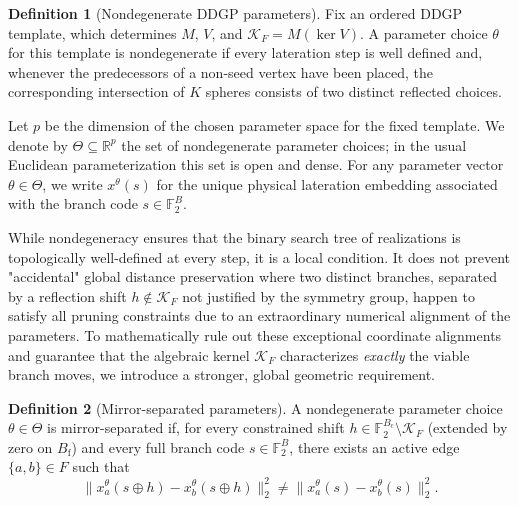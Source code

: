 \documentclass[11pt]{article}
\theoremstyle{plain}
\theoremstyle{definition}
\newtheorem{definition}{Definition}
\begin{document}
\begin{definition}[Nondegenerate DDGP parameters]
\label{def:nondegenerate-params}
Fix an ordered DDGP template, which determines $M$, $V$, and $\mathcal{K}_F = M(\ker V)$. A parameter choice $\theta$ for this template is nondegenerate if every lateration step is well defined and, whenever the predecessors of a non-seed vertex have been placed, the corresponding intersection of $K$ spheres consists of two distinct reflected choices. 
\end{definition}

Let $p$ be the dimension of the chosen parameter space for the fixed template. We denote by $\Theta \subseteq \mathbb{R}^p$ the set of nondegenerate parameter choices; in the usual Euclidean parameterization this set is open and dense. For any parameter vector $\theta \in \Theta$, we write $x^\theta(s)$ for the unique physical lateration embedding associated with the branch code $s \in \mathbb{F}_2^B$.

While nondegeneracy ensures that the binary search tree of realizations is topologically well-defined at every step, it is a local condition. It does not prevent "accidental" global distance preservation where two distinct branches, separated by a reflection shift $h \notin \mathcal{K}_F$ not justified by the symmetry group, happen to satisfy all pruning constraints due to an extraordinary numerical alignment of the parameters. To mathematically rule out these exceptional coordinate alignments and guarantee that the algebraic kernel $\mathcal{K}_F$ characterizes \emph{exactly} the viable branch moves, we introduce a stronger, global geometric requirement.

\begin{definition}[Mirror-separated parameters]
\label{def:mirror-sep}
A nondegenerate parameter choice $\theta \in \Theta$ is mirror-separated if, for every constrained shift $h\in\mathbb{F}_2^{B_{\mathrm{c}}}\setminus\mathcal{K}_F$ (extended by zero on $B_{\mathrm{f}}$) and every full branch code $s\in\mathbb{F}_2^B$, there exists an active edge $\{a,b\} \in F$ such that
\[
\|x^\theta_a(s \oplus h) - x^\theta_b(s \oplus h)\|_2^2 \neq \|x^\theta_a(s) - x^\theta_b(s)\|_2^2.
\]
\end{definition}
\end{document}
